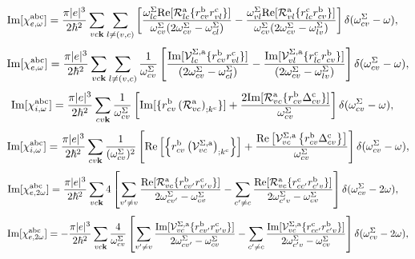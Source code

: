 \begin{align}\label{imchiew}
\mathrm{Im}[\chi_{e,\omega}^{\mathrm{a}\mathrm{b}\mathrm{c}}]
&=
\frac{\pi |e|^3}{2\hbar^2} 
\sum_{vc\mathbf{k}}
\sum_{l\neq(v,c)}
\left[
\frac{\omega^\Sigma_{lc}\mathrm{Re}[{\cal R}^{\mathrm{a}}_{lc}\{r^{\mathrm{b}}_{cv}r^{\mathrm{c}}_{vl}\}]}
{\omega^\Sigma_{cv}(2\omega^\Sigma_{cv}-\omega^\Sigma_{cl})}
-
\frac{\omega^\Sigma_{vl}\mathrm{Re}[{\cal R}^{\mathrm{a}}_{vl}\{r^{\mathrm{c}}_{lc}r^{\mathrm{b}}_{cv}\}]}
{\omega^\Sigma_{cv}(2\omega^\Sigma_{cv}-\omega^\Sigma_{lv})}
\right]
\delta(\omega^\Sigma_{cv}-\omega)
,
\end{align}  
\begin{equation}\label{c-calvimchiewn}
\mathrm{Im}[\chi_{e,\omega}^{\mathrm{a}\mathrm{b}\mathrm{c}}] =
\frac{\pi |e|^3}{2\hbar^2}\sum_{vc\mathbf{k}}\sum_{l\neq(v,c)}\frac{1}{\omega^\Sigma_{cv}}
\left[
\frac{\mathrm{Im}[\mathcal{V}^{\Sigma,\text{a}}_{lc}\{r^{\mathrm{b}}_{cv}r^{\mathrm{c}}_{vl}\}]}
{(2\omega^\Sigma_{cv}-\omega^\Sigma_{cl})} 
-\frac{\mathrm{Im}[\mathcal{V}^{\Sigma,\text{a}}_{vl}\{r^{\mathrm{c}}_{lc}r^{\mathrm{b}}_{cv}\}]}
{(2\omega^\Sigma_{cv}-\omega^\Sigma_{lv})}
\right]\delta(\omega^\Sigma_{cv}-\omega),
\end{equation}  
\begin{align}\label{imchiwf}
\mathrm{Im}[\chi_{i,\omega}^{\mathrm{a}\mathrm{b}\mathrm{c}}]
&=
\frac{\pi|e|^3}{2\hbar^2}
\sum_{cv\mathbf{k}}
\frac{1}{\omega^\Sigma_{cv}}
\left[
\mathrm{Im}[\{r^{\mathrm{b}}_{cv}\left({\cal R}^{\mathrm{a}}_{vc}\right)_{;k^{\mathrm{c}}}\}]
+
\frac{2\mathrm{Im}[{\cal R}^{\mathrm{a}}_{vc}\{r^{\mathrm{b}}_{cv}\Delta^{\mathrm{c}}_{cv}\}]}{\omega^\Sigma_{cv}}
\right]
\delta(\omega^\Sigma_{cv}-\omega)
,
\end{align}
\begin{equation}\label{c-calvimchiwn}
\mathrm{Im}[\chi_{i,\omega}^{\mathrm{a}\mathrm{b}\mathrm{c}}]
= \frac{\pi\vert e\vert^3}{2\hbar^2}\sum_{cv\mathbf{k}}\frac{1}{(\omega^\Sigma_{cv})^{2}}
\left[
\mathrm{Re}\left[\left\{r^{\text{b}}_{cv}\left(\mathcal{V}^{\Sigma,\text{a}}_{vc}\right)_{;k^{\text{c}}}\right\}\right]
+\frac{\mathrm{Re}\left[\mathcal{V}^{\Sigma,\text{a}}_{vc}\left\{r^{\text{b}}_{cv}
\Delta^{\text{c}}_{cv}\right\}\right]}{\omega^\Sigma_{cv}} 
\right]\delta(\omega^\Sigma_{cv}-\omega),
\end{equation}
\begin{align}\label{imchie2w}
\mathrm{Im}[\chi_{e,2\omega}^{\mathrm{a}\mathrm{b}\mathrm{c}}]
&=
\frac{\pi |e|^3}{2\hbar^2} 
\sum_{vc\mathbf{k}} 
4
\left[
\sum_{v'\ne v}
\frac{\mathrm{Re}[{\cal
    R}^{\mathrm{a}}_{vc}\{r^{\mathrm{b}}_{cv'}r^{\mathrm{c}}_{v'v}\}]}{2\omega^\Sigma_{cv'}-\omega^\Sigma_{cv}}
-
\sum_{c'\ne c}
\frac{\mathrm{Re}[{\cal R}^{\mathrm{a}}_{vc}\{r^{\mathrm{c}}_{cc'}r^{\mathrm{b}}_{c'v}\}]}
{2\omega^\Sigma_{c'v}-\omega^\Sigma_{cv}}
\right]
\delta(\omega^\Sigma_{cv}-2\omega)
,
\end{align}  
\begin{equation}\label{c-calvimchie2wn}
\mathrm{Im}[\chi_{e,2\omega}^{\mathrm{a}\mathrm{b}\mathrm{c}}] =
-\frac{\pi |e|^3}{2\hbar^2}\sum_{vc\mathbf{k}}\frac{4}{\omega^\Sigma_{cv}}
\left[
\sum_{v'\ne
  v}\frac{\mathrm{Im}[\mathcal{V}^{\Sigma,\text{a}}_{vc}\{r^{\mathrm{b}}_{cv'}r^{\mathrm{c}}_{v'v}\}]}
{2\omega^\Sigma_{cv'}-\omega^\Sigma_{cv}}
- \sum_{c'\ne
  c}\frac{\mathrm{Im}[\mathcal{V}^{\Sigma,\text{a}}_{vc}\{r^{\mathrm{c}}_{cc'}r^{\mathrm{b}}_{c'v}\}]}
{2\omega^\Sigma_{c'v}-\omega^\Sigma_{cv}}
\right]\delta(\omega^\Sigma_{cv}-2\omega),
\end{equation}
